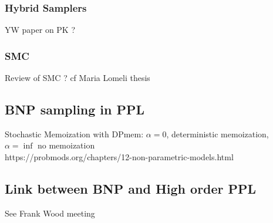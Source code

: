 \subsubsection{Hybrid Samplers}
YW paper on PK ?

\subsubsection{SMC}
Review of SMC ?
cf Maria Lomeli thesis


\subsection{BNP sampling in PPL}

Stochastic Memoization with DPmem: $\alpha = 0$, deterministic memoization, $\alpha = \inf$ no memoization\\
https://probmods.org/chapters/12-non-parametric-models.html


\subsection{Link between BNP and High order PPL}
See Frank Wood meeting
